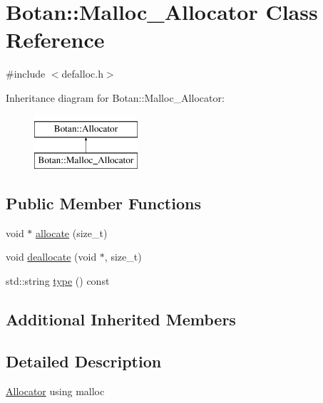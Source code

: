\hypertarget{classBotan_1_1Malloc__Allocator}{\section{Botan\-:\-:Malloc\-\_\-\-Allocator Class Reference}
\label{classBotan_1_1Malloc__Allocator}
}


{\ttfamily \#include $<$defalloc.\-h$>$}

Inheritance diagram for Botan\-:\-:Malloc\-\_\-\-Allocator\-:\begin{figure}[H]
\begin{center}
\leavevmode
\includegraphics[height=2.000000cm]{classBotan_1_1Malloc__Allocator}
\end{center}
\end{figure}
\subsection*{Public Member Functions}
\begin{DoxyCompactItemize}
\item 
void $\ast$ \hyperlink{classBotan_1_1Malloc__Allocator_a9e3e1ec65aa70c7ef7fb1881c5a5d5e7}{allocate} (size\-\_\-t)
\item 
void \hyperlink{classBotan_1_1Malloc__Allocator_a87decac6d77a2fa31d4ba1d78ca6e74e}{deallocate} (void $\ast$, size\-\_\-t)
\item 
std\-::string \hyperlink{classBotan_1_1Malloc__Allocator_a9b14143c4852d304129e8c1f93faa9a1}{type} () const 
\end{DoxyCompactItemize}
\subsection*{Additional Inherited Members}


\subsection{Detailed Description}
\hyperlink{classBotan_1_1Allocator}{Allocator} using malloc 

